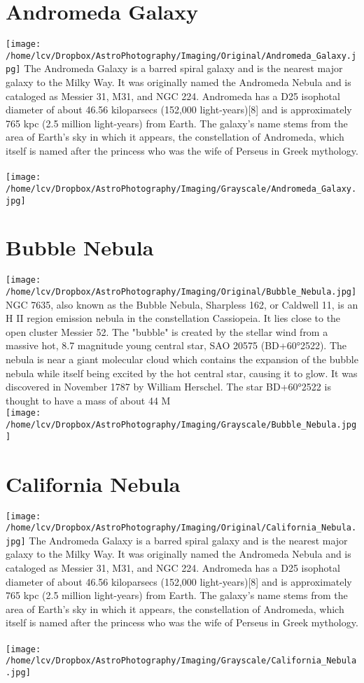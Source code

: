 \newpage\pagecolor{black}\color{white}
\section{Andromeda Galaxy}
\texttt{[image: /home/lcv/Dropbox/AstroPhotography/Imaging/Original/Andromeda\_Galaxy.jpg]}
{\footnotesize\color{white}
The Andromeda Galaxy is a barred spiral galaxy and is the nearest major galaxy to the Milky Way. It was originally named the Andromeda Nebula and is cataloged as Messier 31, M31, and NGC 224. Andromeda has a D25 isophotal diameter of about 46.56 kiloparsecs (152,000 light-years)[8] and is approximately 765 kpc (2.5 million light-years) from Earth. The galaxy's name stems from the area of Earth's sky in which it appears, the constellation of Andromeda, which itself is named after the princess who was the wife of Perseus in Greek mythology. 
}\ \\
\texttt{[image: /home/lcv/Dropbox/AstroPhotography/Imaging/Grayscale/Andromeda\_Galaxy.jpg]}
\section{Bubble Nebula}
\texttt{[image: /home/lcv/Dropbox/AstroPhotography/Imaging/Original/Bubble\_Nebula.jpg]}
{\footnotesize\color{white}
NGC 7635, also known as the Bubble Nebula, Sharpless 162, or Caldwell 11, is an H II region emission nebula in the constellation Cassiopeia. It lies close to the open cluster Messier 52. The "bubble" is created by the stellar wind from a massive hot, 8.7 magnitude young central star, SAO 20575 (BD+60°2522). The nebula is near a giant molecular cloud which contains the expansion of the bubble nebula while itself being excited by the hot central star, causing it to glow. It was discovered in November 1787 by William Herschel. The star BD+60°2522 is thought to have a mass of about 44 M 
}\ \\
\texttt{[image: /home/lcv/Dropbox/AstroPhotography/Imaging/Grayscale/Bubble\_Nebula.jpg]}
\section{California Nebula}
\texttt{[image: /home/lcv/Dropbox/AstroPhotography/Imaging/Original/California\_Nebula.jpg]}
{\footnotesize\color{white}
The Andromeda Galaxy is a barred spiral galaxy and is the nearest major galaxy to the Milky Way. It was originally named the Andromeda Nebula and is cataloged as Messier 31, M31, and NGC 224. Andromeda has a D25 isophotal diameter of about 46.56 kiloparsecs (152,000 light-years)[8] and is approximately 765 kpc (2.5 million light-years) from Earth. The galaxy's name stems from the area of Earth's sky in which it appears, the constellation of Andromeda, which itself is named after the princess who was the wife of Perseus in Greek mythology. 
}\ \\
\texttt{[image: /home/lcv/Dropbox/AstroPhotography/Imaging/Grayscale/California\_Nebula.jpg]}
